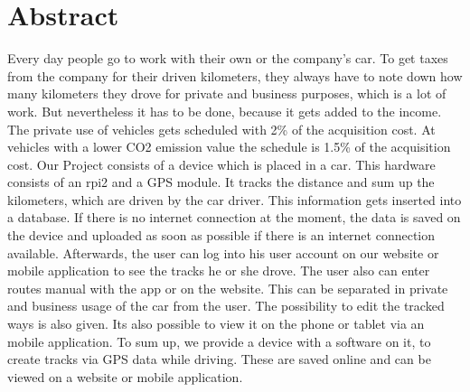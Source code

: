 \chapter*{Abstract}
Every day people go to work with their own or the company's car. To get taxes from the company for their driven kilometers, they always have to note down how many kilometers they drove for private and business purposes, which is a lot of work. But nevertheless it has to be done, because it gets added to the income. The private use of vehicles gets scheduled with 2\% of the acquisition cost. At vehicles with a lower CO2 emission value the schedule is 1.5\% of the acquisition cost.
\newline \newline
Our Project consists of a device which is placed in a car. This hardware consists of an \gls{rpi2} and a GPS module. It tracks the distance and sum up the kilometers, which are driven by the car driver. This information gets inserted into a database. If there is no internet connection at the moment, the data is saved on the device and uploaded as soon as possible if there is an internet connection available. Afterwards, the user can log into his user account on our website or mobile application to see the tracks he or she drove. The user also can enter routes manual with the app or on the website. This can be separated in private and business usage of the car from the user. The possibility to edit the tracked ways is also given. Its also possible to view it on the phone or tablet via an mobile application.
\newline \newline
To sum up, we provide a device with a software on it, to create tracks via GPS data while driving. These are saved online and can be viewed on a website or mobile application.